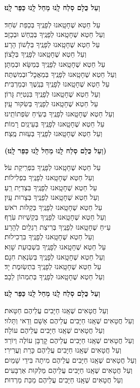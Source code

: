 \documentclass[twoside, openany, parskip=half, 11pt]{book}
\begin{document}
\textbf{וְעַל כֻּלָם סְלַח לָֽנוּ מְחַל לָֽנוּ כַּפֵּר לָֽנוּ׃}

עַל חֵטְא שֶׁחָטָֽאנוּ לְפָנֶֽיךָ בְּכַפַּת שֹֽׁחַד׃ \\ וְעַל חֵטְא שֶׁחָטָֽאנוּ לְפָנֶֽיךָ בְּכַּֽחַשׁ וּבְכָזָב׃ \\
עַל חֵטְא שֶׁחָטָֽאנוּ לְפָנֶֽיךָ בְּלָשׁוֹן הָרָע׃\\ וְעַל חֵטְא שֶׁחָטָֽאנוּ לְפָנֶֽיךָ בְּלָצוֹן׃\\
עַל חֵטְא שֶׁחָטָֽאנוּ לְפָנֶֽיךָ בְּמַשָּׂא וּבְמַתָּן׃ \\ וְעַל חֵטְא שֶׁחָטָֽאנוּ לְפָנֶֽיךָ בְּמַאֲכׇל־וּבְמִשְׁתֶּה׃\\
עַל חֵטְא שֶׁחָטָֽאנוּ לְפָנֶֽיךָ בְּנֶֽשֶׁךְ וּבְמַרְבִּית׃\\ וְעַל חֵטְא שֶׁחָטָֽאנוּ לְפָנֶֽיךָ בִּנְטִיַּת גָּרוֹן׃ \\
עַל חֵטְא שֶׁחָטָֽאנוּ לְפָנֶֽיךָ בְּשִׂקּוּר עָֽיִן׃\\ וְעַל חֵטְא שֶׁחָטָֽאנוּ לְפָנֶֽיךָ בְּשִֽׂיחַ שִׂפְתוֹתֵֽינוּ׃ \\
עַל חֵטְא שֶׁחָטָֽאנוּ לְפָנֶֽיךָ בְּעֵינַֽיִם רָמוֹת׃\\ וְעַל חֵטְא שֶׁחָטָֽאנוּ לְפָנֶֽיךָ בְּעַזּוּת מֶֽצַח׃

\textbf{(וְעַל כֻּלָם סְלַח לָֽנוּ מְחַל לָֽנוּ כַּפֵּר לָֽנוּ׃)}

עַל חֵטְא שֶׁחָטָֽאנוּ לְפָנֶֽיךָ בִּפְרִֽיקַת עֹל׃\\ וְעַל חֵטְא שֶׁחָטָֽאנוּ לְפָנֶֽיךָ בִּפְלִילוֹת׃ \\
עַל חֵטְא שֶׁחָטָֽאנוּ לְפָנֶֽיךָ בִּצְדִיַּת רֵֽעַ׃ \\ וְעַל חֵטְא שֶׁחָטָֽאנוּ לְפָנֶֽיךָ בְּצָרוּת עָֽיִן׃ \\
עַל חֵטְא שֶׁחָטָֽאנוּ לְפָנֶֽיךָ בְּקַלּוּת רֹאשׁ׃\\ וְעַל חֵטְא שֶׁחָטָֽאנוּ לְפָנֶֽיךָ בְּקַשְׁיוּת עֹֽרֶף׃ \\
עַ״חֵ שֶׁחָטָֽאנוּ לְפָנֶֽיךָ בְּרִיצַת רַגְלַֽיִם לְהָרַע׃\\ וְעַל חֵטְא שֶׁחָטָֽאנוּ לְפָנֶֽיךָ בִּרְכִילוּת׃ \\
עַל חֵטְא שֶׁחָטָֽאנוּ לְפָנֶֽיךָ בִּשְׁבֽוּעַת שָׁוְא׃ \\ וְעַל חֵטְא שֶׁחָטָֽאנוּ לְפָנֶֽיךָ בְּשִׂנְאַת חִנָם׃ \\
עַל חֵטְא שֶׁחָטָֽאנוּ לְפָנֶֽיךָ בִּתְשֽׂוּמֶת יָד׃\\ וְעַל חֵטְא שֶׁחָטָֽאנוּ לְפָנֶֽיךָ בְּתִמְהוֹן לֵבָב׃

\textbf{וְעַל כֻּלָם סְלַח לָֽנוּ מְחַל לָֽנוּ כַּפֵּר לָֽנוּ׃}


וְעַל חֲטָאִים שֶׁאָֽנוּ חַיָּבִים עֲלֵיהֶם חַטָּאת׃\\
וְעַל חֲטָאִים שֶׁאָֽנוּ חַיָּבִים עֲלֵיהֶם אָשָׁם וַדַאי וְתָּלוּי׃\\
וְעַל חֲטָאִים שֶׁאָֽנוּ חַיָּבִים עֲלֵיהֶם עוֹלָה׃\\
וְעַל חֲטָאִים שֶׁאָֽנוּ חַיָּבִים עֲלֵיהֶם קׇרְבָּן עוֹלֶה וְיוֹרֵד׃\\
וְעַל חֲטָאִים שֶׁאָֽנוּ חַיָּבִים עֲלֵיהֶם כָּרֵת וְעֲרִירִי׃\\
וְעַל חֲטָאִים שֶׁאָֽנוּ חַיָּבִים עֲלֵיהֶם מִיתָה בִּידֵי שָׁמַיִם׃\\
וְעַל חֲטָאִים שֶׁאָֽנוּ חַיָּבִים עֲלֵיהֶם מַּלְקּוּת אַרְבָּעִים׃\\
וְעַל חֲטָאִים שֶׁאָֽנוּ חַיָּבִים עֲלֵיהֶם מַכַּת מַרְדוּת׃
\end{document}
